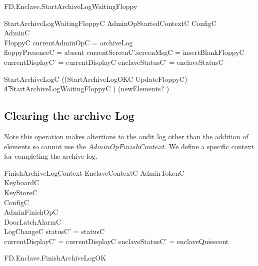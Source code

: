 \begin{traceunit}{FD.Enclave.StartArchiveLogWaitingFloppy}
\end{traceunit}

\begin{schema}{StartArchiveLogWaitingFloppyC}
        AdminOpStartedContextC
\also   
        \Xi ConfigC
\\      \Xi AdminC    
\\      \Xi FloppyC
\where
        \The currentAdminOpC = archiveLog
\\      floppyPresenceC = absent
\also
        currentScreenC'.screenMsgC = insertBlankFloppyC
\\      currentDisplayC' = currentDisplayC
\also
        enclaveStatusC' = enclaveStatusC
\end{schema}

\begin{zed}
        StartArchiveLogC  ((StartArchiveLogOKC \semi UpdateFloppyC) 
\\ \t4                  \lor StartArchiveLogWaitingFloppyC  ) \hide
                        (newElements? )
\end{zed}


\subsection{Clearing the archive Log}

Note this operation makes altertions to the audit log other than the
addition of elements so cannot use
the $AdminOpFinishContext$. We define a specific context for
completing the archive log.

\begin{schema}{FinishArchiveLogContext}
        EnclaveContextC
\also
        \Xi AdminTokenC
\\      \Xi KeyboardC
\\      \Xi KeyStoreC
\\      \Xi ConfigC
\\      AdminFinishOpC     
\\      \Xi DoorLatchAlarmC
\\      LogChangeC
\where
        statusC' = statusC
\\      currentDisplayC' = currentDisplayC
\also
        enclaveStatusC' = enclaveQuiescent
\end{schema}


\begin{traceunit}{FD.Enclave.FinishArchiveLogOK}
\end{traceunit}


